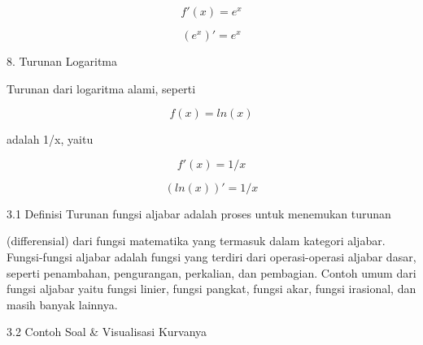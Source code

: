 \documentclass[a4paper,10pt]{article}
\begin{document}
\begin{eulernotebook}
\begin{eulercomment}
\begin{eulercomment}
\begin{eulercomment}
\begin{eulercomment}
\begin{eulercomment}
\begin{eulercomment}
\begin{eulercomment}
\begin{eulercomment}
\begin{eulercomment}
\begin{eulercomment}
\begin{eulercomment}
\begin{eulercomment}
\begin{eulercomment}
\begin{eulercomment}
\begin{eulercomment}
\end{eulercomment}
\begin{eulerformula}
\[
f'(x)=e^x
\]
\end{eulerformula}
\begin{eulercomment}
\end{eulercomment}
\begin{eulerformula}
\[
(e^x)'=e^x
\]
\end{eulerformula}
\begin{eulercomment}
8. Turunan Logaritma

Turunan dari logaritma alami, seperti\\
\end{eulercomment}
\begin{eulerformula}
\[
f(x)=ln(x)
\]
\end{eulerformula}
\begin{eulercomment}
adalah 1/x, yaitu\\
\end{eulercomment}
\begin{eulerformula}
\[
f'(x)=1/x
\]
\end{eulerformula}
\begin{eulercomment}
\end{eulercomment}
\begin{eulerformula}
\[
(ln(x))'=1/x
\]
\end{eulerformula}
\begin{eulercomment}
\begin{eulercomment}
\begin{eulercomment}
\end{eulercomment}
\begin{eulerttcomment}
    3.1 Definisi
       Turunan fungsi aljabar adalah proses untuk menemukan turunan
\end{eulerttcomment}
\begin{eulercomment}
(differensial) dari fungsi matematika yang termasuk dalam kategori
aljabar. Fungsi-fungsi aljabar adalah fungsi yang terdiri dari
operasi-operasi aljabar dasar, seperti penambahan, pengurangan,
perkalian, dan pembagian. Contoh umum dari fungsi aljabar yaitu fungsi
linier, fungsi pangkat, fungsi akar, fungsi irasional, dan masih
banyak lainnya.

\end{eulercomment}
\begin{eulerttcomment}
    3.2 Contoh Soal & Visualisasi Kurvanya
\end{eulerttcomment}
\begin{eulercomment}


\end{eulercomment}
\end{eulercomment}
\end{eulercomment}
\end{eulercomment}
\end{eulercomment}
\end{eulercomment}
\end{eulercomment}
\end{eulercomment}
\end{eulercomment}
\end{eulercomment}
\end{eulercomment}
\end{eulercomment}
\end{eulercomment}
\end{eulercomment}
\end{eulercomment}
\end{eulercomment}
\end{eulercomment}
\end{eulernotebook}
\end{document}
